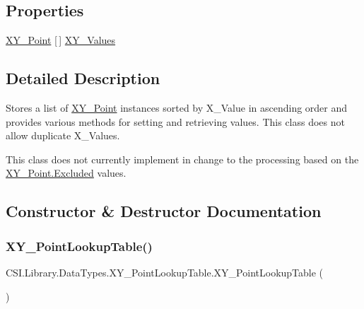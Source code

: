 \subsection*{Properties}
\begin{DoxyCompactItemize}
\item 
\mbox{\hyperlink{struct_c_s_i_1_1_library_1_1_data_types_1_1_x_y___point}{X\+Y\+\_\+\+Point}} \mbox{[}$\,$\mbox{]} \mbox{\hyperlink{class_c_s_i_1_1_library_1_1_data_types_1_1_x_y___point_lookup_table_af0dee0eee9181f55b723f1cccac6877a}{X\+Y\+\_\+\+Values}}
\end{DoxyCompactItemize}


\subsection{Detailed Description}
Stores a list of \mbox{\hyperlink{struct_c_s_i_1_1_library_1_1_data_types_1_1_x_y___point}{X\+Y\+\_\+\+Point}} instances sorted by X\+\_\+\+Value in ascending order and provides various methods for setting and retrieving values. This class does not allow duplicate X\+\_\+\+Values. 

This class does not currently implement in change to the processing based on the \mbox{\hyperlink{struct_c_s_i_1_1_library_1_1_data_types_1_1_x_y___point_ad68cafc4f9fbf764346eb821d885e9fe}{X\+Y\+\_\+\+Point.\+Excluded}} values. 

\subsection{Constructor \& Destructor Documentation}
\mbox{\label{class_c_s_i_1_1_library_1_1_data_types_1_1_x_y___point_lookup_table_a3cb5167efae35b3817028ee668aafa58}} 
\subsubsection{\texorpdfstring{XY\_PointLookupTable()}{XY\_PointLookupTable()}\hspace{0.1cm}{\footnotesize\ttfamily [1/2]}}
{\footnotesize\ttfamily C\+S\+I.\+Library.\+Data\+Types.\+X\+Y\+\_\+\+Point\+Lookup\+Table.\+X\+Y\+\_\+\+Point\+Lookup\+Table (\begin{DoxyParamCaption}{ }\end{DoxyParamCaption})\hspace{0.3cm}{\ttfamily [inline]}}



